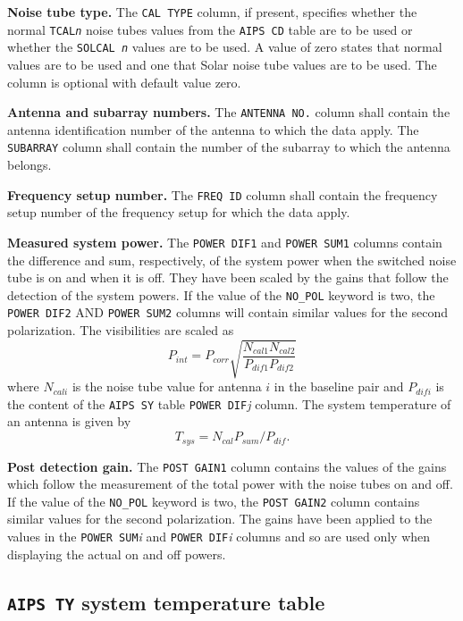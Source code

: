 \documentclass[twoside]{article}
\newcommand{\Hi}[1]{\textcolor{hicol}{#1}}
\begin{document}
\Hi{{\bf Noise tube type.} The {\tt CAL TYPE} column, if present,
specifies whether the normal {\tt TCAL{\it n}} noise tubes values from
the {\tt AIPS CD} table are to be used or whether the {\tt SOLCAL{\it
 n}} values are to be used.  A value of zero states that normal values
are to be used and one that Solar noise tube values are to be used.
The column is optional with default value zero.}

{\bf Antenna and subarray numbers.}  The {\tt ANTENNA NO.} column
shall contain the antenna identification number of the antenna to
which the data apply.  The {\tt SUBARRAY} column shall contain the
number of the subarray to which the antenna belongs.

{\bf Frequency setup number.}  The {\tt FREQ ID} column shall contain
the frequency setup number of the frequency setup for which the data
apply.

{\bf Measured system power.} The {\tt POWER DIF1} and {\tt POWER SUM1}
columns contain the difference and sum, respectively, of the system
power when the switched noise tube is on and when it is off.  They
have been scaled by the gains that follow the detection of the system
powers.  If the value of the {\tt NO\_POL} keyword is two, the {\tt
POWER DIF2} AND {\tt POWER SUM2} columns will contain similar values
for the second polarization. The visibilities are scaled as
\begin{equation}
      P_{int} = P_{corr}
      \sqrt{\frac{N_{cal1}N_{cal2}}{P_{dif1}P_{dif2}}}
\end{equation}
where $N_{cali}$ is the noise tube value for antenna $i$ in the
baseline pair and $P_{difi}$ is the content of the {\tt AIPS SY} table
{\tt POWER DIF}{\it j} column.  The system temperature of an antenna
is given by
\begin{equation}
      T_{sys} =  N_{cal} P_{sum} / P_{dif}.
\end{equation}

{\bf Post detection gain.} The {\tt POST GAIN1} column contains the
values of the gains which follow the measurement of the total power
with the noise tubes on and off.  If the value of the {\tt NO\_POL}
keyword is two, the {\tt POST GAIN2} column contains similar values
for the second polarization.  The gains have been applied to the
values in the {\tt POWER SUM}{\it i} and {\tt POWER DIF}{\it i}
columns and so are used only when displaying the actual on and off
powers.

\subsection{{\tt AIPS TY} system temperature table}
\label{s:TY}
\end{document}
